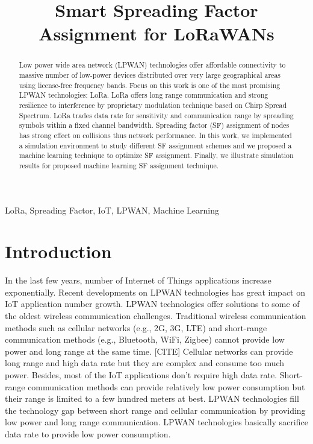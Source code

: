 \documentclass[conference]{IEEEtran}
\begin{document}
\title{Smart Spreading Factor Assignment for LoRaWANs}


\author{
}
\maketitle


\begin{abstract}
Low power wide area network (LPWAN) technologies offer affordable connectivity to massive number of low-power devices distributed over very large geographical areas using license-free frequency bands. Focus on this work is one of the most promising LPWAN technologies: LoRa. LoRa offers long range communication and strong resilience to interference by proprietary modulation technique based on Chirp Spread Spectrum. LoRa trades data rate for sensitivity and communication range by spreading symbols within a fixed channel bandwidth. Spreading factor (SF) assignment of nodes has strong effect on collisions thus network performance. In this work, we implemented a simulation environment to study different SF assignment schemes and we proposed a machine learning technique to optimize SF assignment. Finally, we illustrate simulation results for proposed machine learning SF assignment technique.
\end{abstract}


\begin{IEEEkeywords}
LoRa, Spreading Factor, IoT, LPWAN, Machine Learning
\end{IEEEkeywords}


\section{Introduction}
\par In the last few years, number of Internet of Things applications increase exponentially. \cite{7721743} Recent developments on LPWAN technologies has great impact on IoT application number growth. LPWAN technologies offer solutions to some of the oldest wireless communication challenges. Traditional wireless communication methods such as cellular networks (e.g., 2G, 3G, LTE) and short-range communication methods (e.g., Bluetooth, WiFi, Zigbee) cannot provide low power and long range at the same time. [CITE] Cellular networks can provide long range and high data rate but they are complex and consume too much power. Besides, most of the IoT applications don't require high data rate. Short-range communication methods can provide relatively low power consumption but their range is limited to a few hundred meters at best. \cite{7815384} LPWAN technologies fill the technology gap between short range and cellular communication by providing low power and long range communication. LPWAN technologies basically sacrifice data rate to provide low power consumption.
\end{document}
